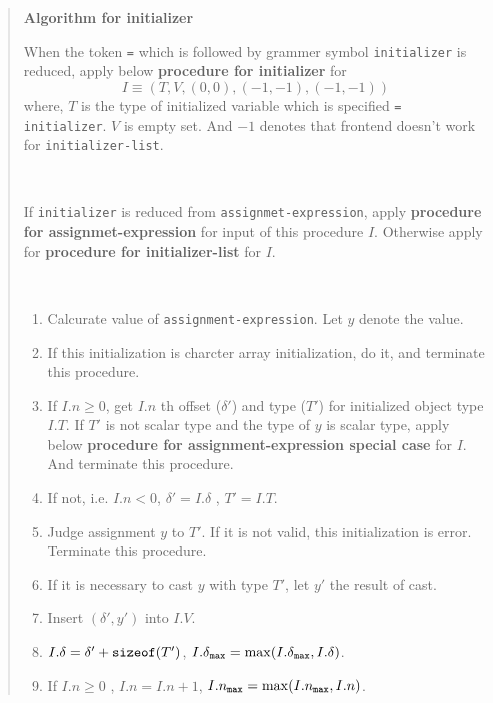 \begin{quotation}
{\bf Algorithm for initializer}
\begin{description}
When the token {\tt{=}} which is followed by
grammer symbol {\tt{initializer}} is reduced,
apply below {\bf procedure for initializer} for
\[
I \equiv (T,V,(0,0),(-1,-1),(-1,-1))
\]
where, $T$ is the type of initialized variable
which is specified {\tt{= initializer}}.
$V$ is empty set. And $-1$ denotes that
frontend doesn't work for {\tt{initializer-list}}.

\item[procedure for initializer]

\

If {\tt{initializer}} is reduced from {\tt{assignmet-expression}},
apply {\bf procedure for assignmet-expression} for input of this
procedure $I$. Otherwise apply for
{\bf procedure for initializer-list} for $I$.




\item[procedure for assignmet-expression]

\

\begin{enumerate}
\item Calcurate value of {\tt assignment-expression}. Let $y$ denote
      the value. 
\item \label{initializer010}
      If this initialization is charcter array initialization,
      do it, and terminate this procedure.
\item \label{initializer004}
      If $I.n \ge 0$, get $I.n$ th offset (${\delta}'$) and type ($T'$)
      for initialized object type $I.T$.
      If $T'$ is not scalar type and the type of $y$ is scalar type,
      apply below {\bf procedure for assignment-expression special case}
      for $I$. And terminate this procedure. 
\item If not, i.e. $I.n < 0$,
      ${\delta}' = I.\delta$ , $T' = I.T$.
\item Judge assignment $y$ to $T'$. If it is not valid, this
      initialization is error. Terminate this procedure.
\item If it is necessary to cast $y$ with type $T'$,
      let $y'$ the result of cast.
\item Insert $({\delta}', y')$ into $I.V$.
\item $I.\delta = {\delta}' + {\tt sizeof}(T')$,
      ${I.\delta}_{\tt{max}} = \max({I.\delta}_{\tt{max}}, I.{\delta})$.
\item If $I.n \ge 0$ , $I.n = I.n + 1$,
       $I.n_{\tt{max}} = \max(I.n_{\tt{max}}, I.n)$.
\end{enumerate}


\end{description}
\end{quotation}
